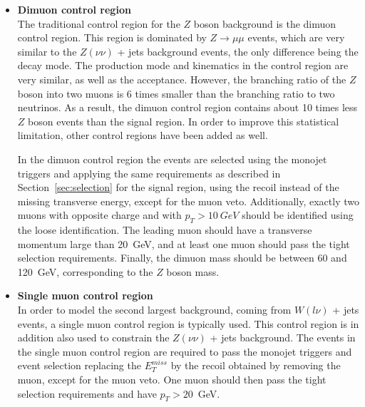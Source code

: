 \begin{itemize}
 \item[] \textbf{Dimuon control region}\\ The traditional control region for the $Z$ boson background is the dimuon control region. This region is dominated by $Z\rightarrow\mu\mu$ events, which are very similar to the $Z(\nu\nu)$ + jets background events, the only difference being the decay mode. The production mode and kinematics in the control region are very similar, as well as the acceptance. However, the branching ratio of the $Z$ boson into two muons is 6 times smaller than the branching ratio to two neutrinos. As a result, the dimuon control region contains about 10 times less $Z$ boson events than the signal region. In order to improve this statistical limitation, other control regions have been added as well.

In the dimuon control region the events are selected using the monojet triggers and applying the same requirements as described in Section~\ref{sec:selection} for the signal region, using the recoil instead of the missing transverse energy, except for the muon veto. Additionally, exactly two muons with opposite charge and with $p_T > \SI{10}{GeV}$ should be identified using the loose identification. The leading muon should have a transverse momentum large than \SI{20}{GeV}, and at least one muon should pass the tight selection requirements. Finally, the dimuon mass should be between 60 and \SI{120}{GeV}, corresponding to the $Z$ boson mass.

\item[] \textbf{Single muon control region}\\ In order to model the second largest background, coming from $W(l\nu)$ + jets events, a single muon control region is typically used. This control region is in addition also used to constrain the $Z(\nu\nu)$ + jets background. The events in the single muon control region are required to pass the monojet triggers and event selection replacing the $E_T^{miss}$ by the recoil obtained by removing the muon, except for the muon veto. One muon should then pass the tight selection requirements and have $p_T > 20$~GeV.


\end{itemize}
